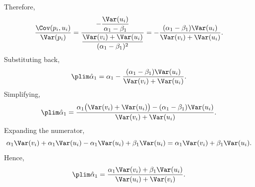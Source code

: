 \documentclass[12pt, letterpaper, onecolumn]{exam}
\begin{document}
\begin{solution}
    Therefore,
    $$
        \frac{\Cov(p_i,u_i)}{\Var(p_i)}
        =
        \frac{-\dfrac{\Var(u_i)}{\alpha_1-\beta_1}}
        {\dfrac{\Var(v_i)+\Var(u_i)}{(\alpha_1-\beta_1)^2}}
        =
        -\frac{(\alpha_1-\beta_1)\Var(u_i)}{\Var(v_i)+\Var(u_i)}.
    $$
    Substituting back,
    $$
        \plim \hat\alpha_1
        =
        \alpha_1-\frac{(\alpha_1-\beta_1)\Var(u_i)}{\Var(v_i)+\Var(u_i)}.
    $$
    Simplifying,
    $$
        \plim \hat\alpha_1
        =
        \frac{\alpha_1\bigl(\Var(v_i)+\Var(u_i)\bigr)-(\alpha_1-\beta_1)\Var(u_i)}
        {\Var(v_i)+\Var(u_i)}.
    $$
    Expanding the numerator,
    $$
        \alpha_1\Var(v_i)+\alpha_1\Var(u_i)-\alpha_1\Var(u_i)+\beta_1\Var(u_i)
        =
        \alpha_1\Var(v_i)+\beta_1\Var(u_i).
    $$
    Hence,
    $$
        \plim \hat\alpha_1
        =
        \frac{\alpha_1 \Var(v_i)+\beta_1 \Var(u_i)}
        {\Var(u_i)+\Var(v_i)}.
    $$
\end{solution}
\end{document}
